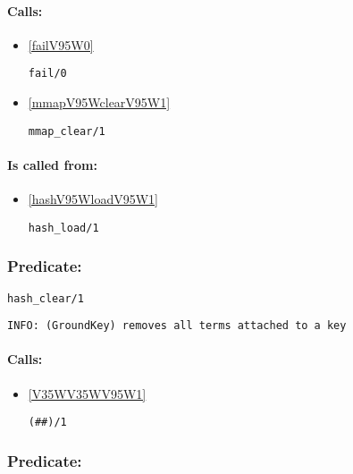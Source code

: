 \paragraph{Calls:} 
\begin{itemize}
\item \ref{failV95W0} 
\begin{verbatim}
fail/0
\end{verbatim}

\item \ref{mmapV95WclearV95W1} 
\begin{verbatim}
mmap_clear/1
\end{verbatim}

\end{itemize}
\paragraph{Is called from:} 
\begin{itemize}
\item \ref{hashV95WloadV95W1} 
\begin{verbatim}
hash_load/1
\end{verbatim}

\end{itemize}

\subsubsection{Predicate:} \label{hashV95WclearV95W1}

\begin{verbatim}
hash_clear/1
\end{verbatim}

{\small \begin{verbatim}
INFO: (GroundKey) removes all terms attached to a key

\end{verbatim}}
\paragraph{Calls:} 
\begin{itemize}
\item \ref{V35WV35WV95W1} 
\begin{verbatim}
(##)/1
\end{verbatim}

\end{itemize}

\subsubsection{Predicate:} \label{hashV95WclearV95W2}

